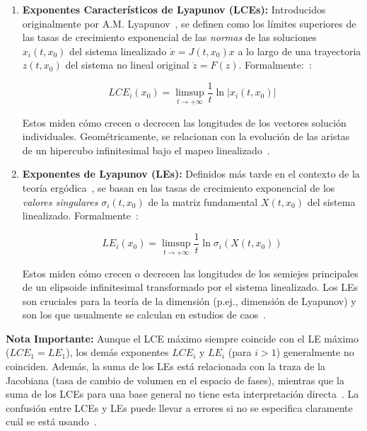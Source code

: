 \begin{enumerate}
    \item \textbf{Exponentes Característicos de Lyapunov (LCEs):} Introducidos originalmente por A.M. Lyapunov~\cite{Lyapunov1992}, se definen como los límites superiores de las tasas de crecimiento exponencial de las \textit{normas} de las soluciones $x_i(t, x_0)$ del sistema linealizado $\dot{x} = J(t, x_0)x$ a lo largo de una trayectoria $z(t, x_0)$ del sistema no lineal original $\dot{z} = F(z)$. Formalmente:~\cite{Kuznetsov2005, Kuznetsov2016}:

    \begin{equation}
        LCE_i(x_0) = \limsup_{t \to +\infty} \frac{1}{t} \ln |x_i(t, x_0)|
    \end{equation}

    Estos miden cómo crecen o decrecen las longitudes de los vectores solución individuales. Geométricamente, se relacionan con la evolución de las aristas de un hipercubo infinitesimal bajo el mapeo linealizado~\cite{Kuznetsov2016}.

    \item \textbf{Exponentes de Lyapunov (LEs):} Definidos más tarde en el contexto de la teoría ergódica~\cite{Oseledec1968}, se basan en las tasas de crecimiento exponencial de los \textit{valores singulares} $\sigma_i(t, x_0)$ de la matriz fundamental $X(t, x_0)$ del sistema linealizado. Formalmente~\cite{Kuznetsov2016}:

    \begin{equation}
        LE_i(x_0) = \limsup_{t \to +\infty} \frac{1}{t} \ln \sigma_i(X(t, x_0))
    \end{equation}

    Estos miden cómo crecen o decrecen las longitudes de los semiejes principales de un elipsoide infinitesimal transformado por el sistema linealizado. Los LEs son cruciales para la teoría de la dimensión (p.ej., dimensión de Lyapunov) y son los que usualmente se calculan en estudios de caos~\cite{Kuznetsov2016}.
\end{enumerate}

\textbf{Nota Importante:} Aunque el LCE máximo siempre coincide con el LE máximo ($LCE_1 = LE_1$), los demás exponentes $LCE_i$ y $LE_i$ (para $i > 1$) generalmente no coinciden. Además, la suma de los LEs está relacionada con la traza de la Jacobiana (tasa de cambio de volumen en el espacio de fases), mientras que la suma de los LCEs para una base general no tiene esta interpretación directa~\cite{Kuznetsov2016}. La confusión entre LCEs y LEs puede llevar a errores si no se especifica claramente cuál se está usando~\cite{Cvitanovic2012}.

